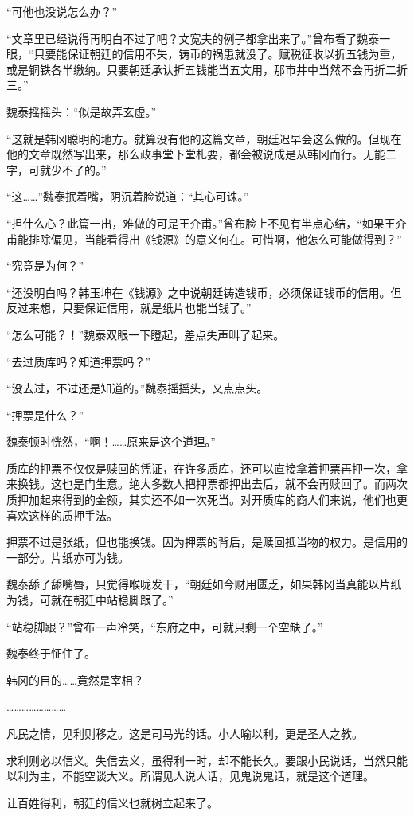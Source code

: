 “可他也没说怎么办？”

“文章里已经说得再明白不过了吧？文宽夫的例子都拿出来了。”曾布看了魏泰一眼，“只要能保证朝廷的信用不失，铸币的祸患就没了。赋税征收以折五钱为重，或是铜铁各半缴纳。只要朝廷承认折五钱能当五文用，那市井中当然不会再折二折三。”

魏泰摇摇头：“似是故弄玄虚。”

“这就是韩冈聪明的地方。就算没有他的这篇文章，朝廷迟早会这么做的。但现在他的文章既然写出来，那么政事堂下堂札要，都会被说成是从韩冈而行。无能二字，可就少不了的。”

“这……”魏泰抿着嘴，阴沉着脸说道：“其心可诛。”

“担什么心？此篇一出，难做的可是王介甫。”曾布脸上不见有半点心结，“如果王介甫能排除偏见，当能看得出《钱源》的意义何在。可惜啊，他怎么可能做得到？”

“究竟是为何？”

“还没明白吗？韩玉坤在《钱源》之中说朝廷铸造钱币，必须保证钱币的信用。但反过来想，只要保证信用，就是纸片也能当钱了。”

“怎么可能？！”魏泰双眼一下瞪起，差点失声叫了起来。

“去过质库吗？知道押票吗？”

“没去过，不过还是知道的。”魏泰摇摇头，又点点头。

“押票是什么？”

魏泰顿时恍然，“啊！……原来是这个道理。”

质库的押票不仅仅是赎回的凭证，在许多质库，还可以直接拿着押票再押一次，拿来换钱。这也是门生意。绝大多数人把押票都押出去后，就不会再赎回了。而两次质押加起来得到的金额，其实还不如一次死当。对开质库的商人们来说，他们也更喜欢这样的质押手法。

押票不过是张纸，但也能换钱。因为押票的背后，是赎回抵当物的权力。是信用的一部分。片纸亦可为钱。

魏泰舔了舔嘴唇，只觉得喉咙发干，“朝廷如今财用匮乏，如果韩冈当真能以片纸为钱，可就在朝廷中站稳脚跟了。”

“站稳脚跟？”曾布一声冷笑，“东府之中，可就只剩一个空缺了。”

魏泰终于怔住了。

韩冈的目的……竟然是宰相？

……………………

凡民之情，见利则移之。这是司马光的话。小人喻以利，更是圣人之教。

求利则必以信义。失信去义，虽得利一时，却不能长久。要跟小民说话，当然只能以利为主，不能空谈大义。所谓见人说人话，见鬼说鬼话，就是这个道理。

让百姓得利，朝廷的信义也就树立起来了。

